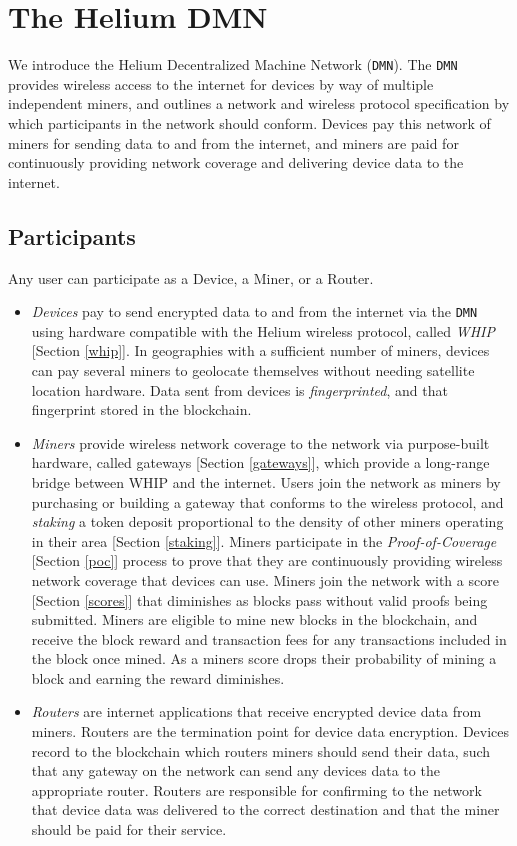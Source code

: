\documentclass[10pt, nonatbib, nocopyrightspace, reprint]{sigplanconf}
\begin{document}
\section{The Helium DMN}

We introduce the Helium Decentralized Machine Network (\verb|DMN|). The \verb|DMN| provides wireless access to the internet for devices by way of multiple independent miners, and outlines a network and wireless protocol specification by which participants in the network should conform. Devices pay this network of miners for sending data to and from the internet, and miners are paid for continuously providing network coverage and delivering device data to the internet.

\subsection{Participants}

Any user can participate as a Device, a Miner, or a Router.

\begin{itemize}
    \item \emph{Devices} pay to send encrypted data to and from the internet via the \verb|DMN| using hardware compatible with the Helium wireless protocol, called \emph{WHIP} [Section \ref{whip}]. In geographies with a sufficient number of miners, devices can pay several miners to geolocate themselves without needing satellite location hardware. Data sent from devices is \emph{fingerprinted}, and that fingerprint stored in the blockchain.
    \item \emph{Miners} provide wireless network coverage to the network via purpose-built hardware, called gateways [Section \ref{gateways}], which provide a long-range bridge between WHIP and the internet. Users join the network as miners by purchasing or building a gateway that conforms to the wireless protocol, and \emph{staking} a token deposit proportional to the density of other miners operating in their area [Section \ref{staking}]. Miners participate in the \emph{Proof-of-Coverage} [Section \ref{poc}] process to prove that they are continuously providing wireless network coverage that devices can use. Miners join the network with a score [Section \ref{scores}] that diminishes as blocks pass without valid proofs being submitted. Miners are eligible to mine new blocks in the blockchain, and receive the block reward and transaction fees for any transactions included in the block once mined. As a miners score drops their probability of mining a block and earning the reward diminishes.
    \item \emph{Routers} are internet applications that receive encrypted device data from miners. Routers are the termination point for device data encryption. Devices record to the blockchain which routers miners should send their data, such that any gateway on the network can send any devices data to the appropriate router. Routers are responsible for confirming to the network that device data was delivered to the correct destination and that the miner should be paid for their service.
\end{itemize}
\end{document}
